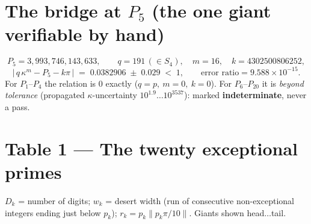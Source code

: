 \documentclass[11pt]{article}
\newcommand{\dt}{\ldots}
\begin{document}
\section*{The bridge at $P_5$ (the one giant verifiable by hand)}
\[
P_5 = 3{,}993{,}746{,}143{,}633,\qquad q = 191\,(\in S_4),\quad m = 16,\quad k = 4302500806252,
\]
\[
\bigl|\,q\,\kappa^{m} - P_5 - k\pi\,\bigr| \;=\; 0.0382906 \;\pm\; 0.029 \;<\; 1,
\qquad \text{error ratio} = 9.588\times 10^{-15}.
\]
For $P_1$--$P_4$ the relation is $0$ exactly ($q=p,\ m=0,\ k=0$).
For $P_6$--$P_{20}$ it is \emph{beyond tolerance} (propagated $\kappa$-uncertainty
$10^{1.9}\dots10^{3537}$): marked \textbf{indeterminate}, never a pass.

\section*{Table 1 --- The twenty exceptional primes}
$D_k$ = number of digits; $w_k$ = desert width (run of consecutive
non-exceptional integers ending just below $p_k$); $r_k = p_k\lVert p_k\pi/10\rVert$.
Giants shown head$\dt$tail.
\end{document}

